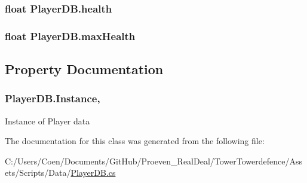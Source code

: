 \subsubsection[{\texorpdfstring{health}{health}}]{\setlength{\rightskip}{0pt plus 5cm}float Player\+D\+B.\+health}\hypertarget{class_player_d_b_a349dde17e68f7c93fd689643514ef1a7}{}\label{class_player_d_b_a349dde17e68f7c93fd689643514ef1a7}
\subsubsection[{\texorpdfstring{max\+Health}{maxHealth}}]{\setlength{\rightskip}{0pt plus 5cm}float Player\+D\+B.\+max\+Health}\hypertarget{class_player_d_b_a41578d9c4e3730f7f3cc7481c9b11bda}{}\label{class_player_d_b_a41578d9c4e3730f7f3cc7481c9b11bda}


\subsection{Property Documentation}
\subsubsection[{\texorpdfstring{Instance}{Instance}}]{ Player\+D\+B.\+Instance\hspace{0.3cm}{\ttfamily [static]}, {\ttfamily [get]}}\hypertarget{class_player_d_b_a3cd572351792685b7fb3761b7f233b15}{}\label{class_player_d_b_a3cd572351792685b7fb3761b7f233b15}


Instance of Player data 



The documentation for this class was generated from the following file\+:\begin{DoxyCompactItemize}
\item 
C\+:/\+Users/\+Coen/\+Documents/\+Git\+Hub/\+Proeven\+\_\+\+Real\+Deal/\+Tower\+Towerdefence/\+Assets/\+Scripts/\+Data/\hyperlink{_player_d_b_8cs}{Player\+D\+B.\+cs}\end{DoxyCompactItemize}
